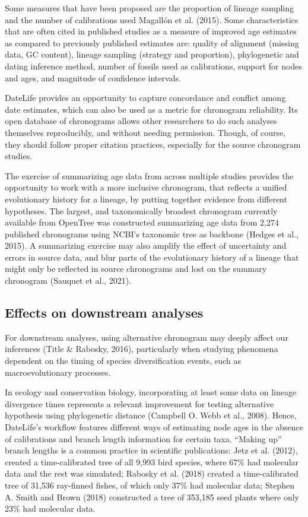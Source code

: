 \documentclass[
  english,
  man]{apa6}
\begin{document}
Some measures that have been proposed are the proportion of lineage sampling and the number of calibrations used Magallón et al. (2015).
Some characteristics that are often cited in published studies as a measure of improved age estimates as compared to previously published estimates are: quality of alignment (missing data, GC content), lineage sampling (strategy and proportion), phylogenetic and dating inference method, number of fossils used as calibrations, support for nodes and ages, and magnitude of confidence intervals.

DateLife provides an opportunity to capture concordance and conflict among date estimates, which can also be used as a metric for chronogram reliability.
Its open database of chronograms allows other researchers to do such analyses themselves reproducibly, and without needing permission. Though, of course, they should follow proper citation practices, especially for the source chronogram studies.

The exercise of summarizing age data from across multiple studies provides the opportunity to work with a more inclusive chronogram,
that reflects a unified evolutionary history for a lineage, by putting together evidence from different hypotheses.
The largest, and taxonomically broadest chronogram currently available from OpenTree was constructed summarizing age data from 2,274 published chronograms using NCBI's taxonomic tree as backbone (Hedges et al., 2015).
A summarizing exercise may also amplify the effect of uncertainty and errors in source data, and blur parts of the evolutionary history of a lineage that might only be reflected in source chronograms and lost on the summary chronogram (Sauquet et al., 2021).

\hypertarget{effects-on-downstream-analyses}{%
\subsection{Effects on downstream analyses}\label{effects-on-downstream-analyses}}

For downstream analyses, using alternative chronogram may deeply affect our inferences (Title \& Rabosky, 2016), particularly when studying phenomena dependent on the timing of species diversification events, such as macroevolutionary processes.

In ecology and conservation biology, incorporating at least some data on lineage divergence times represents a relevant improvement for testing alternative hypothesis using phylogenetic distance (Campbell O. Webb et al., 2008).
Hence, DateLife's workflow features different ways of estimating node ages in the absence of calibrations and branch length information for certain taxa.
``Making up'' branch lengths is a common practice in scientific publications: Jetz et al. (2012), created a time-calibrated tree of all 9,993 bird species, where 67\% had molecular data and the rest was simulated; Rabosky et al. (2018) created a time-calibrated tree of 31,536 ray-finned fishes, of which only 37\% had molecular data; Stephen A. Smith and Brown (2018) constructed a tree of 353,185 seed plants where only 23\% had molecular data.
\end{document}
